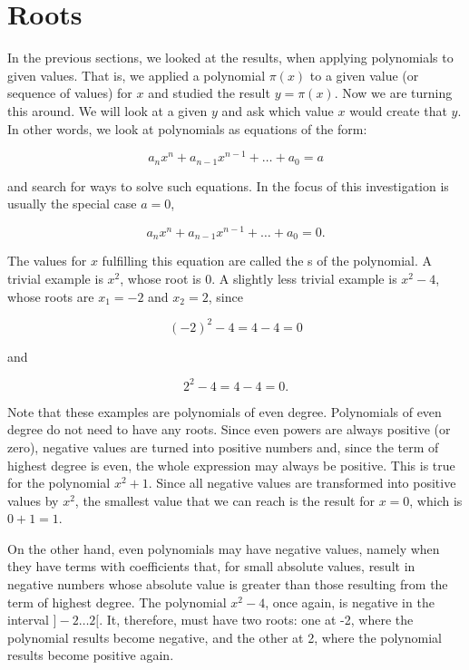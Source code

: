 \documentclass[tikz]{scrreprt}
\begin{document}
\section{Roots}

In the previous sections, we looked at the results,
when applying polynomials to given values.
That is, we applied a polynomial $\pi(x)$ to
a given value (or sequence of values) for $x$ 
and studied the result $y = \pi(x)$.
Now we are turning this around. We will look at
a given $y$ and ask which value $x$ would
create that $y$. In other words, 
we look at polynomials as equations of the form:

\begin{equation}
a_nx^n + a_{n-1}x^{n-1} + \dots + a_0 = a
\end{equation}

and search for ways to solve such equations.
In the focus of this investigation is usually
the special case $a=0$, \ie\:

\begin{equation}
a_nx^n + a_{n-1}x^{n-1} + \dots + a_0 = 0.
\end{equation}

The values for $x$ fulfilling this equation
are called the s of the polynomial.
A trivial example is $x^2$, whose root is 0.
A slightly less trivial example is $x^2 - 4$,
whose roots are $x_1 = -2$ and $x_2 = 2$, since

\[
(-2)^2 - 4 = 4 - 4 = 0
\]

and

\[
2^2 - 4 = 4 - 4 = 0.
\]

Note that these examples are polynomials of even degree.
Polynomials of even degree do not need to have any roots.
Since even powers are always positive (or zero), negative values
are turned into positive numbers and, since the term of highest
degree is even, the whole expression may always be positive.
This is true for the polynomial $x^2 + 1$. Since all negative values
are transformed into positive values by $x^2$, the smallest value
that we can reach is the result for $x=0$, which is $0+1=1$.

On the other hand, even polynomials may have negative values,
namely when they have terms with coefficients that, 
for small absolute values,
result in negative numbers whose absolute value
is greater than those resulting from
the term of highest degree. 
The polynomial $x^2 - 4$, once again, is negative
in the interval $]-2\dots 2[$. It, therefore, must have two roots:
one at -2, where the polynomial results become negative, and the other at 2,
where the polynomial results become positive again.
\end{document}
